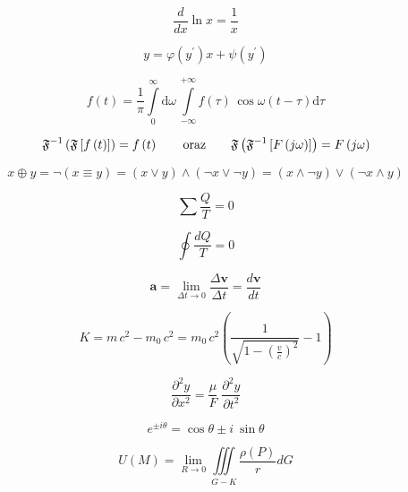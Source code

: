 \begin{equation}
    \frac{d}{dx} \ln x = \frac{1}{x}
\end{equation}

\begin{equation}
    y = \varphi  (y^\prime)x + \psi(y^\prime)
\end{equation}

\begin{equation}
    f(t) = \frac{1}{\pi} \int\limits_0^\infty \mathrm{d} \omega \,\int\limits_{-\infty}^{+\infty} f(\tau)\, \cos \omega (t-\tau)  \mathrm{d}\tau
\end{equation}

\[
    \mathfrak{F}^{-1}\left(\mathfrak{F} \left[ f\left(t \right ) \right ] \right ) = f \left(t \right )
    \qquad \textup{oraz} \qquad
    \mathfrak{F}\left(\mathfrak{F}^{-1} \left[ F\left(j\omega \right ) \right ] \right ) = F \left(j\omega \right )
\]

\begin{equation*}
    x \oplus y = \neg (x \equiv y) = (x \vee y) \wedge (\neg x \vee \neg y) = (x \wedge \neg y) \vee (\neg x \wedge y)
\end{equation*}

\begin{equation*}
    \sum \frac{Q}{T} = 0
\end{equation*}

\begin{equation}
    \oint \frac{dQ}{T} = 0
\end{equation}

\begin{equation}
    \pmb{a} = \lim\limits_{\Delta t \to 0} \frac{\Delta \pmb{v}}{\Delta t} = \frac{d\pmb{v}}{dt}
\end{equation}

\begin{equation}
    K = m\,c^2 - m_0\,c^2
    = m_0\,c^2 \left(
    \frac{1}{ \sqrt{1 - \left( \frac{v}{c} \right)^2 } } -1
    \right)
\end{equation}

\begin{equation}
    \frac{\partial^2 y}{\partial x^2} = \frac{\mu}{F} \; \frac{\partial^2 y}{\partial t^2}
\end{equation}

\begin{equation}
    e^{\pm i\theta} = \cos \theta \pm i~\sin\theta
\end{equation}

\begin{equation}
    U(M) = \lim\limits_{R\to 0} \iiint\limits_{G-K}\frac{\rho(P)}{r}dG
\end{equation}

